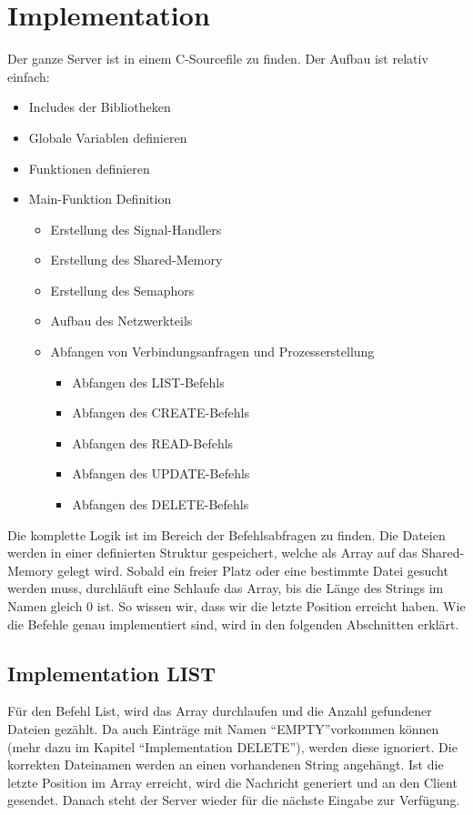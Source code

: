 \documentclass[12pt,a4paper,ngerman]{report}
\begin{document}
\section{Implementation}
Der ganze Server ist in einem C-Sourcefile zu finden. Der Aufbau ist relativ einfach:
\begin{itemize}
	\item Includes der Bibliotheken
	\item Globale Variablen definieren
	\item Funktionen definieren
	\item Main-Funktion Definition
		\begin{itemize}
		\item Erstellung des Signal-Handlers
		\item Erstellung des Shared-Memory
		\item Erstellung des Semaphors
		\item Aufbau des Netzwerkteils
		\item Abfangen von Verbindungsanfragen und Prozesserstellung
			\begin{itemize}
			\item Abfangen des LIST-Befehls
			\item Abfangen des CREATE-Befehls
			\item Abfangen des READ-Befehls
			\item Abfangen des UPDATE-Befehls
			\item Abfangen des DELETE-Befehls
			\end{itemize}
		\end{itemize}
\end{itemize}
Die komplette Logik ist im Bereich der Befehlsabfragen zu finden. Die Dateien werden in einer definierten Struktur gespeichert, welche als Array auf das Shared-Memory gelegt wird. Sobald ein freier Platz oder eine bestimmte Datei gesucht werden muss, durchläuft eine Schlaufe das Array, bis die Länge des Strings im Namen gleich 0 ist. So wissen wir, dass wir die letzte Position erreicht haben. Wie die Befehle genau implementiert sind, wird in den folgenden Abschnitten erklärt.
\subsection{Implementation LIST}
Für den Befehl List, wird das Array durchlaufen und die Anzahl gefundener Dateien gezählt. Da auch Einträge mit Namen \textquotedblleft EMPTY\textquotedblright vorkommen können (mehr dazu im Kapitel \textquotedblleft Implementation DELETE\textquotedblright), werden diese ignoriert. Die korrekten Dateinamen werden an einen vorhandenen String angehängt. Ist die letzte Position im Array erreicht, wird die Nachricht generiert und an den Client gesendet. Danach steht der Server wieder für die nächste Eingabe zur Verfügung.
\end{document}
